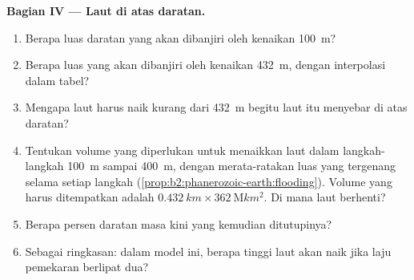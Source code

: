 \begin{problem}
\noindent\textbf{Bagian IV --- Laut di atas daratan.}
\begin{enumerate}[resume]
  \item Berapa luas daratan yang akan dibanjiri oleh kenaikan \qty{100}{m}?
  \item Berapa luas yang akan dibanjiri oleh kenaikan \qty{432}{m}, dengan interpolasi dalam tabel?
  \item Mengapa laut harus naik kurang dari \qty{432}{m} begitu laut itu menyebar di atas daratan?
  \item Tentukan volume yang diperlukan untuk menaikkan laut dalam langkah-langkah \qty{100}{m} sampai \qty{400}{m},
        dengan merata-ratakan luas yang tergenang selama setiap langkah (\cref{prop:b2:phanerozoic-earth:flooding}).
        Volume yang harus ditempatkan adalah $\qty{0.432}{km} \times \qty{362}{\mega km^2}$. Di mana
        laut berhenti?
  \item Berapa persen daratan masa kini yang kemudian ditutupinya?
  \item Sebagai ringkasan: dalam model ini, berapa tinggi laut akan naik jika laju pemekaran berlipat dua?
\end{enumerate}
\end{problem}
